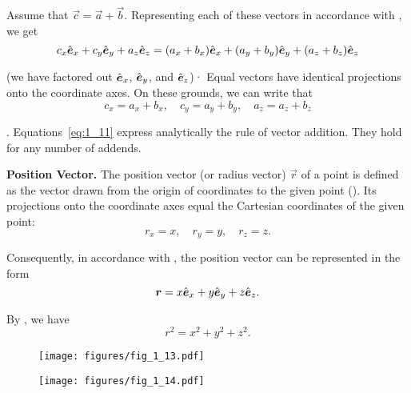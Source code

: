 Assume that $\vec{c}=\vec{a}+\vec{b}$. Representing each of these vectors in accordance with , we get
\begin{equation*}
c_x\hat{\boldsymbol{e}}_{x} + c_y\hat{\boldsymbol{e}}_{y} + a_z\hat{\boldsymbol{e}}_{z} = (a_x+b_x)\hat{\boldsymbol{e}}_{x} + (a_y+b_y)\hat{\boldsymbol{e}}_{y} + (a_z+b_z)\hat{\boldsymbol{e}}_{z}
\end{equation*}

\noindent
(we have factored out $\hat{\boldsymbol{e}}_{x}$, $\hat{\boldsymbol{e}}_{y}$, and $\hat{\boldsymbol{e}}_{z}$)· Equal vectors have identical projections onto the coordinate axes. On these grounds, we can write that
\begin{equation}\label{eq:1_11}
c_x=a_x+b_x,\quad c_y=a_y+b_y,\quad a_z=a_z+b_z
\end{equation}

. Equations~\eqref{eq:1_11} express analytically the rule of vector addition. They hold for any number of addends.

\textbf{Position Vector.} The position vector (or radius vector) $\vec{r}$ of a point is defined as the vector drawn from the origin of coordinates to the given point (). Its projections onto the coordinate axes equal the Cartesian coordinates of the given point:
\begin{equation}\label{eq:1_12}
r_x=x,\quad r_y=y,\quad r_z=z.
\end{equation}

\noindent
Consequently, in accordance with , the position vector can be represented in the form
\begin{equation}\label{eq:1_13}
\boldsymbol{r} = x\hat{\boldsymbol{e}}_{x} + y\hat{\boldsymbol{e}}_{y} + z\hat{\boldsymbol{e}}_{z}.
\end{equation}

\noindent
By , we have
\begin{equation}\label{eq:1_14}
r^2 = x^2 + y^2 + z^2.
\end{equation}

\begin{figure}[t]
	\begin{minipage}[t]{0.5\linewidth}
		\begin{center}
			\texttt{[image: figures/fig\_1\_13.pdf]}
			\caption[]{}
			\label{fig:1_13}
		\end{center}
	\end{minipage}
	\hfill{ }%
	\begin{minipage}[t]{0.5\linewidth}
		\begin{center}
			\texttt{[image: figures/fig\_1\_14.pdf]}
			\caption[]{}
			\label{fig:1_14}
		\end{center}
	\end{minipage}
\vspace{-0.3cm}
\end{figure}

